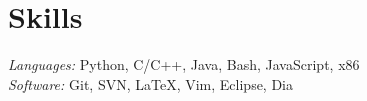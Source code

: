 \section*{Skills}
\textsl{Languages:} Python, C/C++, Java, Bash, JavaScript, x86 \\
\textsl{Software:} Git, SVN, \LaTeX, Vim, Eclipse, Dia
